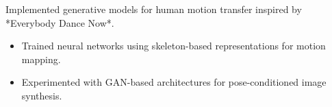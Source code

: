 Implemented generative models for human motion transfer inspired by *Everybody Dance Now*.
\begin{itemize}
\item Trained neural networks using skeleton-based representations for motion mapping.
\item Experimented with GAN-based architectures for pose-conditioned image synthesis.
\end{itemize}
{\LaTeXraggedright
{}
\par}
